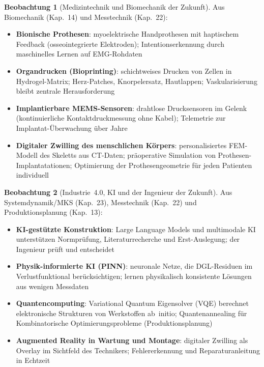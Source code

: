 ﻿\documentclass[a4paper,12pt]{report}
\theoremstyle{definition}
\newtheorem{beobachtung}{Beobachtung}
\begin{document}
\begin{beobachtung}[Medizintechnik und Biomechanik der Zukunft]
Aus Biomechanik (Kap.~14) und Messtechnik (Kap.~22):
\begin{itemize}
    \item[-] \textbf{Bionische Prothesen}: myoelektrische Handprothesen mit
          haptischem Feedback (osseointegrierte Elektroden);
          Intentionserkennung durch maschinelles Lernen auf EMG-Rohdaten
    \item[-] \textbf{Organdrucken (Bioprinting)}: schichtweises Drucken von
          Zellen in Hydrogel-Matrix; Herz-Patches, Knorpelersatz, Hautlappen;
          Vaskularisierung bleibt zentrale Herausforderung
    \item[-] \textbf{Implantierbare MEMS-Sensoren}: drahtlose Drucksensoren
          im Gelenk (kontinuierliche Kontaktdruckmessung ohne Kabel);
          Telemetrie zur Implantat-Überwachung über Jahre
    \item[-] \textbf{Digitaler Zwilling des menschlichen Körpers}:
          personalisiertes FEM-Modell des Skeletts aus CT-Daten;
          präoperative Simulation von Prothesen-Implantatationen;
          Optimierung der Prothesen\-geometrie für jeden Patienten individuell
\end{itemize}
\end{beobachtung}

\begin{beobachtung}[Industrie~4.0, KI und der Ingenieur der Zukunft]
Aus Systemdynamik/MKS (Kap.~23), Messtechnik (Kap.~22) und
Produktionsplanung (Kap.~13):
\begin{itemize}
    \item[-] \textbf{KI-gestützte Konstruktion}: Large Language Models
          und multimodale KI unterstützen Normprüfung, Literaturrecherche
          und Erst-Auslegung; der Ingenieur prüft und entscheidet
    \item[-] \textbf{Physik-informierte KI (PINN)}: neuronale Netze,
          die DGL-Residuen im Verlustfunktional berücksichtigen;
          lernen physikalisch konsistente Lösungen aus wenigen Messdaten
    \item[-] \textbf{Quantencomputing}: Variational Quantum Eigensolver (VQE)
          berechnet elektronische Strukturen von Werkstoffen ab~initio;
          Quantenannealing für Kombinatorische Optimierungsprobleme (Produktionsplanung)
    \item[-] \textbf{Augmented Reality in Wartung und Montage}:
          digitaler Zwilling als Overlay im Sichtfeld des Technikers;
          Fehlererkennung und Reparaturanleitung in Echtzeit
\end{itemize}
\end{beobachtung}
\end{document}
